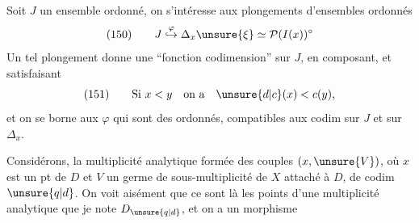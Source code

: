 Soit $J$ un ensemble ordonné, on s'intéresse aux plongements d'ensembles ordonnés
\[
(150)\qquad J\mathrel{\overset{\varphi}{\hookrightarrow}}\Delta_x\unsure{\xi}\simeq\mathcal P(I(x))^\circ
\]
Un tel plongement donne une ``fonction codimension'' sur $J$, en composant,  et  satisfaisant
\[
(151)\qquad\text{Si }x<y\quad\text{on a}\quad\unsure{d|c}(x)<c(y),
\]
et on se borne aux $\varphi$ qui sont des  ordonnés, compatibles aux  codim sur $J$ et sur $\Delta_x$.

Considérons,  la multiplicité analytique formée des couples $(x,\unsure{V})$, où $x$ est un pt de $D$ et $V$ un germe de sous-multiplicité de $X$ attaché à $D$, de codim $\unsure{q|d}$. On  voit aisément que ce sont  là les points d'une multiplicité analytique que je note $D_{\unsure{q|d}}$, et on a un morphisme
